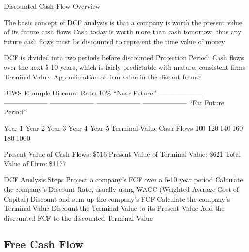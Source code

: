 \documentclass[10pt]{article}
\begin{document}
  \begin{core}{Discounted Cash Flow Overview}

    The basic concept of DCF analysis is that a company is worth the present value of its future cash flows
    Cash today is worth more than cash tomorrow, thus any future cash flows must be discounted to represent the time value of money

    DCF is divided into two periods before discounted
    Projection Period: Cash flows over the next 5-10 years, which is fairly predictable with mature, consistent firms
    Terminal Value: Approximation of firm value in the distant future

    BIWS Example
    Discount Rate: 10\%
    “Near Future”
    --------------------
    --------------------
    --------------------
    --------------------
    --------------------
    “Far Future Period”


    Year 1
    Year 2
    Year 3
    Year 4
    Year 5
    Terminal Value
    Cash Flows
    100
    120
    140
    160
    180
    1000

    Present Value of Cash Flows: \$516
    Present Value of Terminal Value: \$621
    Total Value of Firm: \$1137

    DCF Analysis Steps
    Project a company’s FCF over a 5-10 year period
    Calculate the company’s Discount Rate, usually using WACC (Weighted Average Cost of Capital)
    Discount and sum up the company’s FCF
    Calculate the company’s Terminal Value
    Discount the Terminal Value to its Present Value
    Add the discounted FCF to the discounted Terminal Value

  \end{core}

  \subsection{Free Cash Flow}
\end{document}
